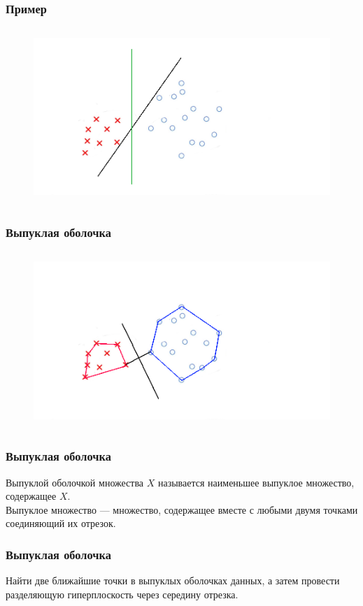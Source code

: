 \documentclass[12pt]{beamer}
\begin{document}
\begin{frame}\frametitle{Пример}
\begin{figure}[htbp]
  \includegraphics[height=190pt, keepaspectratio = true]{images/example}   
\end{figure}
\end{frame}


\begin{frame}\frametitle{Выпуклая оболочка}
\begin{figure}[htbp]
  \includegraphics[height=190pt, keepaspectratio = true]{images/example1}   
\end{figure}
\end{frame}

\begin{frame}\frametitle{Выпуклая оболочка}
Выпуклой оболочкой множества $X$ называется наименьшее выпуклое множество, содержащее $X$.\\
\vspace{5mm}
Выпуклое множество — множество, содержащее вместе с любыми двумя точками соединяющий их отрезок.
\end{frame}

\begin{frame}\frametitle{Выпуклая оболочка}
Найти две ближайшие точки в выпуклых
оболочках данных, а затем провести разделяющую
гиперплоскость через середину отрезка.
\end{frame}
\end{document}
